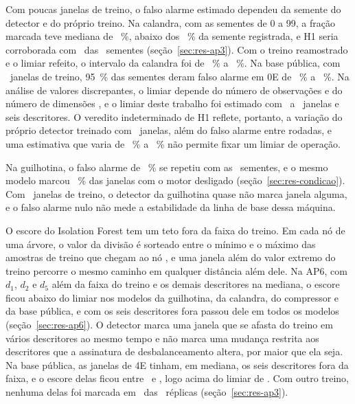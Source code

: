 Com poucas janelas de treino, o falso alarme estimado dependeu da semente do detector e do próprio treino. Na calandra, com as sementes de 0 a \num{99}, a fração marcada teve mediana de \apTresSementeCalandraMed~\%, abaixo dos \hUmCalandraIFDireto~\% da semente registrada, e H1 seria corroborada com \apTresVereditoUmCorroborada\ das \apTresSementes\ sementes (seção~\ref{sec:res-ap3}). Com o treino reamostrado e o limiar refeito, o intervalo da calandra foi de \apTresTreinoInfCalandra~\% a \apTresTreinoSupCalandra~\%. Na base pública, com \hQuatroNTreino\ janelas de treino, \SI{95}{\percent} das sementes deram falso alarme em 0E de \apTresSementeNivelZeroPInf~\% a \apTresSementeNivelZeroPSup~\%. Na análise de valores discrepantes, o limiar depende do número de observações e do número de dimensões \cite[p.~650]{worden2000}, e o limiar deste trabalho foi estimado com \campoJanelasGuilhotinaUm\ a \campoJanelasCalandraUm\ janelas e seis descritores. O veredito indeterminado de H1 reflete, portanto, a variação do próprio detector treinado com \campoJanelasCalandraUm\ janelas, além do falso alarme entre rodadas, e uma estimativa que varia de \apTresTreinoInfCalandra~\% a \apTresTreinoSupCalandra~\% não permite fixar um limiar de operação.

Na guilhotina, o falso alarme de \hUmGuilhotinaIFDireto~\% se repetiu com as \apTresSementes\ sementes, e o mesmo modelo marcou \condGuilhotinaParado~\% das janelas com o motor desligado (seção~\ref{sec:res-condicao}). Com \campoJanelasGuilhotinaUm\ janelas de treino, o detector da guilhotina quase não marca janela alguma, e o falso alarme nulo não mede a estabilidade da linha de base dessa máquina.

O escore do Isolation Forest tem um teto fora da faixa do treino. Em cada nó de uma árvore, o valor da divisão é sorteado entre o mínimo e o máximo das amostras de treino que chegam ao nó \cite{liu2008}, e uma janela além do valor extremo do treino percorre o mesmo caminho em qualquer distância além dele. Na AP6, com $d_1$, $d_2$ e $d_5$ além da faixa do treino e os demais descritores na mediana, o escore ficou abaixo do limiar nos modelos da guilhotina, da calandra, do compressor e da base pública, e com os seis descritores fora passou dele em todos os modelos (seção~\ref{sec:res-ap6}). O detector marca uma janela que se afasta do treino em vários descritores ao mesmo tempo e não marca uma mudança restrita aos descritores que a assinatura de desbalanceamento altera, por maior que ela seja. Na base pública, as janelas de 4E tinham, em mediana, os seis descritores fora da faixa, e o escore delas ficou entre \descEscoreCincoPctQuatro\ e \descEscoreMaxQuatro, logo acima do limiar de \descLimiarQuatro. Com outro treino, nenhuma delas foi marcada em \descReplicasSemMarcacaoQuatro\ das \apTresReplicas\ réplicas (seção~\ref{sec:res-ap3}).

